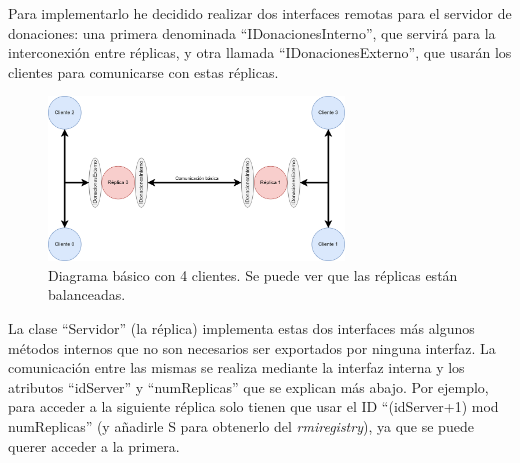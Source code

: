 \documentclass{article}
\begin{document}
Para implementarlo he decidido realizar dos interfaces remotas para el servidor de donaciones: una primera denominada ``IDonacionesInterno'', que servirá para la interconexión entre réplicas, y otra llamada ``IDonacionesExterno'', que usarán los clientes para comunicarse con estas réplicas.


\begin{figure}[H]
    \centering
    \includegraphics[width=0.7\textwidth]{imagenes/Parte 2 basico.png}
    \caption{Diagrama básico con 4 clientes. Se puede ver que las réplicas están balanceadas.}
\end{figure}


La clase ``Servidor'' (la réplica) implementa estas dos interfaces más algunos métodos internos que no son necesarios ser exportados por ninguna interfaz. La comunicación entre las mismas se realiza mediante la interfaz interna y los atributos ``idServer'' y ``numReplicas'' que se explican más abajo. Por ejemplo, para acceder a la siguiente réplica solo tienen que usar el ID  ``(idServer+1) mod numReplicas'' (y añadirle S para obtenerlo del \textit{rmiregistry}), ya que se puede querer acceder a la primera.

\bigskip
\end{document}
